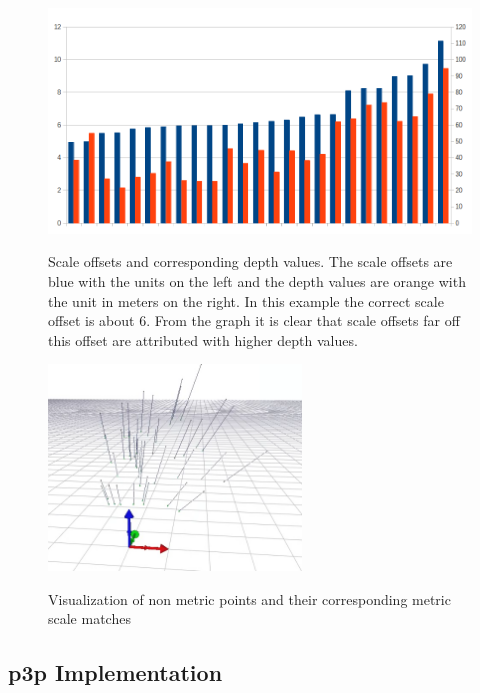 \begin{figure}[H]
  \centering
    \includegraphics[width=1.0\textwidth]{chapters/images/scale_offset_bar_graph}\\
  \caption{Scale offsets and corresponding depth values.  The scale offsets are blue with the units on the left and the depth values are orange with the unit in meters on the right. In this example the correct scale offset is about 6.  From the graph it is clear that scale offsets far off this offset are attributed with higher depth values.}
  \label{fig:scale_bar_graph}
\end{figure}


\begin{figure}[H]
  \centering
    \includegraphics[width=0.6\textwidth]{chapters/images/scale_matches}\\
  \caption{Visualization of non metric points and their corresponding metric scale matches}
  \label{fig:circular_match}
\end{figure}

\subsection{p3p Implementation}

